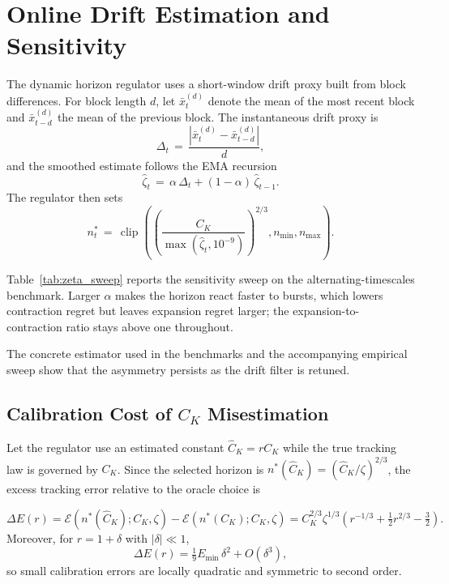 \section{Online Drift Estimation and Sensitivity}\label{app:zeta}

The dynamic horizon regulator uses a short-window drift proxy built from block
differences. For block length $d$, let $\bar x_t^{(d)}$ denote the mean of the
most recent block and $\bar x_{t-d}^{(d)}$ the mean of the previous block. The
instantaneous drift proxy is
\[
  \Delta_t \,=\, \frac{\left|\bar x_t^{(d)} - \bar x_{t-d}^{(d)}\right|}{d},
\]
and the smoothed estimate follows the EMA recursion
\[
  \widehat\zeta_t \,=\, \alpha\,\Delta_t + (1-\alpha)\,\widehat\zeta_{t-1}.
\]
The regulator then sets
\[
  n_t^* \,=\, \operatorname{clip}\!\left(
    \left(\frac{C_K}{\max(\widehat\zeta_t,10^{-9})}\right)^{2/3},
    n_{\min}, n_{\max}
  \right).
\]

Table~\ref{tab:zeta_sweep} reports the sensitivity sweep on the
alternating-timescales benchmark. Larger $\alpha$ makes the horizon react faster to bursts, which lowers
contraction regret but leaves expansion regret larger; the expansion-to-
contraction ratio stays above one throughout.



The concrete estimator used in the benchmarks and the accompanying empirical
sweep show that the asymmetry persists as the drift filter is retuned.

\subsection{Calibration Cost of $C_K$ Misestimation}

Let the regulator use an estimated constant $\widehat C_K = r C_K$ while the
true tracking law is governed by $C_K$. Since the selected horizon is
$n^*(\widehat C_K) = (\widehat C_K/\zeta)^{2/3}$, the excess tracking error
relative to the oracle choice is
\begin{proposition}
\label{prop:calibration_cost}
\[
  \Delta E(r)
  =
  \mathcal{E}(n^*(\widehat C_K); C_K,\zeta)
  -
  \mathcal{E}(n^*(C_K); C_K,\zeta)
  =
  C_K^{2/3}\zeta^{1/3}
  \left(r^{-1/3} + \tfrac12 r^{2/3} - \tfrac32\right).
\]
Moreover, for $r=1+\delta$ with $|\delta| \ll 1$,
\[
  \Delta E(r)
  =
  \tfrac19 E_{\min}\,\delta^2 + O(\delta^3),
\]
so small calibration errors are locally quadratic and symmetric to second order.
\end{proposition}

